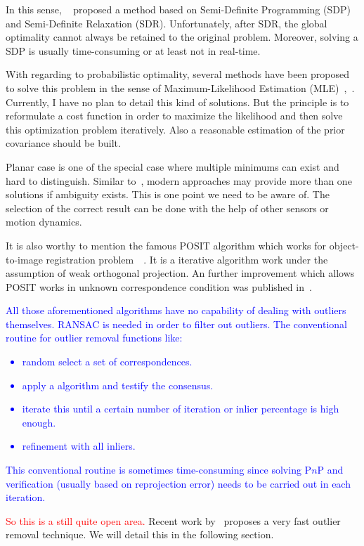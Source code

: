 \documentclass[a4paper]{report}
\begin{document}
In this sense, ~\cite{schweighofer2008globally} proposed a method based on Semi-Definite Programming (SDP) and Semi-Definite Relaxation (SDR). Unfortunately, after SDR, the global optimality cannot always be retained to the original problem. Moreover, solving a SDP is usually time-consuming or at least not in real-time.

With regarding to probabilistic optimality, several methods have been proposed to solve this problem in the sense of Maximum-Likelihood Estimation (MLE)~\cite{ferraz2014leveraging},~\cite{urban2016mlpnp}. Currently, I have no plan to detail this kind of solutions. But the principle is to reformulate a cost function in order to maximize the likelihood and then solve this optimization problem iteratively. Also a reasonable estimation of the prior covariance should be built.

Planar case is one of the special case where multiple minimums can exist and hard to distinguish. Similar to~\cite{rpp}, modern approaches may provide more than one solutions if ambiguity exists. This is one point we need to be aware of. The selection of the correct result can be done with the help of other sensors or motion dynamics.

It is also worthy to mention the famous POSIT algorithm which works for object-to-image registration problem~\cite{dementhon1995model}~\cite{oberkampf1996iterative}. It is a iterative algorithm work under the assumption of weak orthogonal projection. An further improvement which allows POSIT works in unknown correspondence condition was published in~\cite{softposit}.

\textcolor{blue}{All those aforementioned algorithms have no capability of dealing with outliers themselves. RANSAC is needed in order to filter out outliers. The conventional routine for outlier removal functions like: 
\begin{itemize}
\item random select a set of correspondences.
\item apply a algorithm and testify the consensus.
\item iterate this until a certain number of iteration or inlier percentage is high enough.
\item refinement with all inliers.
\end{itemize}
This conventional routine is sometimes time-consuming since solving P$n$P and verification (usually based on reprojection error) needs to be carried out in each iteration.}
\textcolor{red}{So this is a still quite open area.} Recent work by~\cite{ferraz2014very} proposes a very fast outlier removal technique. We will detail this in the following section.
\end{document}
